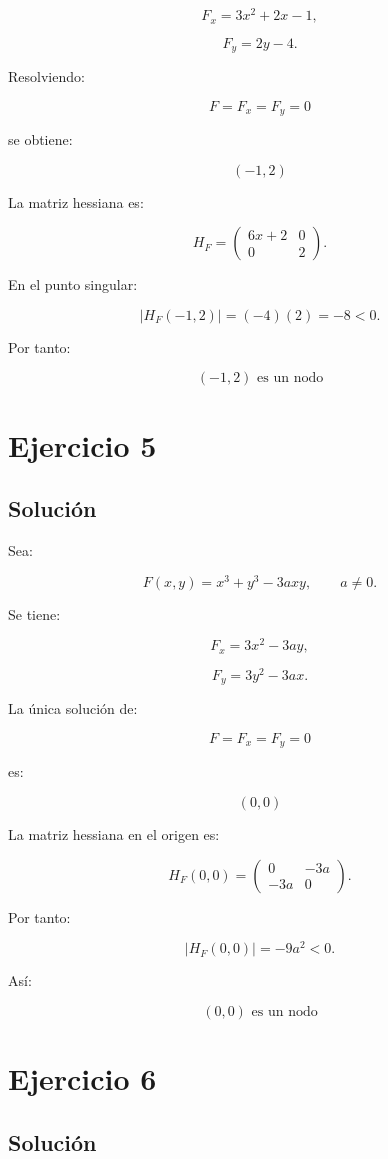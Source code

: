 \documentclass[11pt,a4paper]{article}
\begin{document}
\[
F_x=3x^2+2x-1,
\]

\[
F_y=2y-4.
\]

Resolviendo:

\[
F=F_x=F_y=0
\]

se obtiene:

\[
\boxed{
(-1,2)
}
\]

La matriz hessiana es:

\[
H_F=
\begin{pmatrix}
6x+2&0\\
0&2
\end{pmatrix}.
\]

En el punto singular:

\[
|H_F(-1,2)|
=
(-4)(2)
=
-8<0.
\]

Por tanto:

\[
\boxed{
(-1,2)\text{ es un nodo}
}
\]

\section{Ejercicio 5}
\subsection{Solución}

Sea:

\[
F(x,y)
=
x^3+y^3-3axy,
\qquad
a\neq0.
\]

Se tiene:

\[
F_x=3x^2-3ay,
\]

\[
F_y=3y^2-3ax.
\]

La única solución de:

\[
F=F_x=F_y=0
\]

es:

\[
\boxed{(0,0)}
\]

La matriz hessiana en el origen es:

\[
H_F(0,0)
=
\begin{pmatrix}
0&-3a\\
-3a&0
\end{pmatrix}.
\]

Por tanto:

\[
|H_F(0,0)|
=
-9a^2<0.
\]

Así:

\[
\boxed{
(0,0)\text{ es un nodo}
}
\]

\section{Ejercicio 6}
\subsection{Solución}
\end{document}
